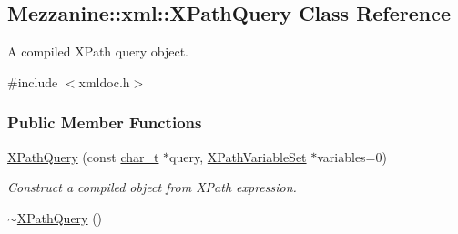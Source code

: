 \hypertarget{classMezzanine_1_1xml_1_1XPathQuery}{
\subsection{Mezzanine::xml::XPathQuery Class Reference}
\label{classMezzanine_1_1xml_1_1XPathQuery}
}


A compiled XPath query object.  




{\ttfamily \#include $<$xmldoc.h$>$}

\subsubsection*{Public Member Functions}
\begin{DoxyCompactItemize}
\item 
\hyperlink{classMezzanine_1_1xml_1_1XPathQuery_a12689a4ab5abd7df0a6fcb5e25971406}{XPathQuery} (const \hyperlink{namespaceMezzanine_1_1xml_a29b8a47c179e9895c4e9e66c45d1dbbc}{char\_\-t} $\ast$query, \hyperlink{classMezzanine_1_1xml_1_1XPathVariableSet}{XPathVariableSet} $\ast$variables=0)
\begin{DoxyCompactList}\small\item\em Construct a compiled object from XPath expression. \item\end{DoxyCompactList}\item 
\hypertarget{classMezzanine_1_1xml_1_1XPathQuery_ad56bb06e8a78275f346756c8db7011d4}{
\hyperlink{classMezzanine_1_1xml_1_1XPathQuery_ad56bb06e8a78275f346756c8db7011d4}{$\sim$XPathQuery} ()}
\label{classMezzanine_1_1xml_1_1XPathQuery_ad56bb06e8a78275f346756c8db7011d4}


\end{DoxyCompactItemize}
